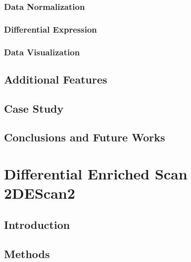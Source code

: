 \documentclass[b5paper,oneside,british,intoc,bibliograph=totoc,index=totoc,BCOR10mm,twoside,openright]{book}
\numberwithin{equation}{section}
\numberwithin{figure}{section}
\begin{document}
\subsection{Data Normalization} \label{sec:ticorsernormalization}


\subsection{Differential Expression} \label{sec:ticorsermethods}


\subsection{Data Visualization} \label{sec:ticorserplots}


\section{Additional Features} \label{sec:ticorseraddfeat}


\section{Case Study} \label{sec:ticorseresults}


\section{Conclusions and Future Works} \label{sec:ticorseconclusions}


\chapter{Differential Enriched Scan 2\newline DEScan2} \label{sec:descan2cap}


\section{Introduction} \label{sec:descan2intro}


\section{Methods} \label{sec:descan2methods}

\end{document}
